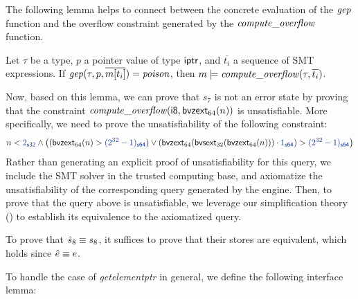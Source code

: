 {%
The following lemma helps to connect between the concrete evaluation of the $\mathit{gep}$ function and the overflow constraint generated by the $\mathit{compute\_overflow}$ function.
\begin{lemma}
Let $\tau$ be a type, $p$ a pointer value of type $\textsf{i\textsf{ptr}}$, and $\overline{t_i}$ a sequence of SMT expressions.
If $\mathit{gep}(\tau, p, \overline{m[t_i]}) = \mathit{poison}$,
then $m \models \mathit{compute\_overflow}(\tau, \overline{t_i})$.
\end{lemma}

Now, based on this lemma,
we can prove that $s_7$ is not an error state by proving that the constraint $\mathit{compute\_overflow}(\textsf{i8}, \textsf{bvzext}_{64}(n))$ is unsatisfiable.
More specifically, we need to prove the unsatisfiability of the following constraint:
\[
n < \bvconst{32}{2} \land \big((\bvzext{64}{n} > \bvconst{64}{(2^{32} - 1)}) \lor (\bvmul{\bvsort{64}}{\bvzext{64}{\bvsext{32}{\bvzext{64}{n}}}}{\bvconst{64}{1}}) > \bvconst{64}{(2^{32} - 1)}\big)
\]
Rather than generating an explicit proof of unsatisfiability for this query,
we include the SMT solver in the trusted computing base,
and axiomatize the unsatisfiability of the corresponding query generated by the \SE engine.
Then, to prove that the query above is unsatisfiable,
we leverage our simplification theory () to establish its equivalence to the axiomatized query.

To prove that $\hat{s}_8 \equiv s_8$,
it suffices to prove that their stores are equivalent, which holds since $\hat{e} \equiv e$.


To handle the case of \textit{getelementptr} in general, we define the following interface lemma:

}
